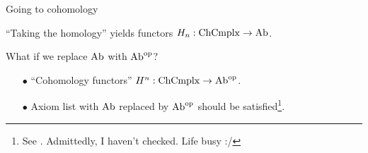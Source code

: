 \begin{frame}{Going to cohomology} %

  \par ``Taking the homology'' yields functors $H_n : \mathrm{ChCmplx} \to \mathrm{Ab}$.
  \pause
  \begin{block}{}
    \centering
    What if we replace $\mathrm{Ab}$ with $\mathrm{Ab}^{\mathrm{op}}$?
  \end{block}
  \pause
  \begin{itemize}
    \item[$\bullet$] ``Cohomology functors'' $H^n : \mathrm{ChCmplx} \to \mathrm{Ab}^{\mathrm{op}}$.
    \item[$\bullet$] Axiom list with $\mathrm{Ab}$ replaced by $\mathrm{Ab}^{\mathrm{op}}$ should be satisfied\footnote{See \cite[\pno~202]{hatcher}. Admittedly, I haven't checked. Life busy :/}.
  \end{itemize}

\end{frame}
